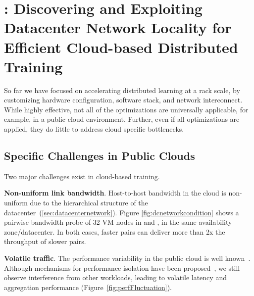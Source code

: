 \section{\plink: Discovering and Exploiting Datacenter Network Locality for Efficient Cloud-based Distributed Training}

So far we have focused on accelerating distributed learning at a rack scale, by customizing hardware configuration, software stack, and network interconnect. While highly effective, not all of the optimizations are universally applicable, for example, in a public cloud environment. Further, even if all optimizations are applied, they do little to address cloud specific bottlenecks.

\subsection{Specific Challenges in Public Clouds}
Two major challenges exist in cloud-based training.

\noindent\textbf{Non-uniform link bandwidth}. Host-to-host bandwidth in the cloud is non-uniform due to the hierarchical structure of the datacenter~(\textsection \ref{sec:datacenternetwork}). %
Figure \ref{fig:dcnetworkcondition} shows a pairwise bandwidth probe of 32 VM nodes in \ectwo and \azure, in the same availability zone/datacenter. In both cases, faster pairs can deliver more than 2x the throughput of slower pairs. %


\noindent\textbf{Volatile traffic}. The performance variability in the public cloud is well known~\cite{cloudVariance1, Iosup:2011:PVP:2007336.2007402,perfVariance}. Although mechanisms for performance isolation have been proposed~\cite{Shieh:2010:SPI:1863103.1863104,Shieh:2011:SDC:1972457.1972489}, we still observe interference from other workloads, leading to volatile latency and aggregation performance (Figure~\ref{fig:perfFluctuation}).

